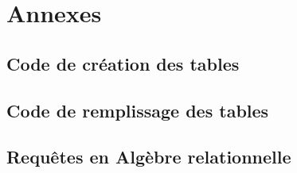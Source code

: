 \documentclass[french]{article}
\begin{document}
\newpage
\appendix
\section{Annexes}

\subsection{Code de création des tables}
\setlength{\columnsep}{1.5cm}
\begin{multicols}{2}

\end{multicols}

\subsection{Code de remplissage des tables}
\setlength{\columnsep}{1.5cm}
\begin{multicols}{2}

\end{multicols}

\subsection{Requêtes en Algèbre relationnelle}
\setlength{\columnsep}{1.5cm}
\begin{multicols}{2}

\end{multicols}
\end{document}
